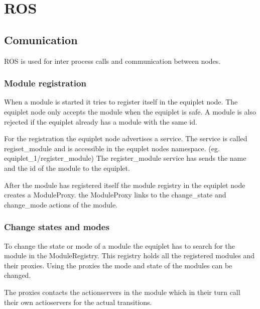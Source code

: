 \section{ROS}
\subsection{Comunication}
ROS is used for inter process calls and communication between nodes.

\subsubsection{Module registration}
When a module is started it tries to register itself in the equiplet node.
The equiplet node only accepts the module when the equiplet is safe.
A module is also rejected if the equiplet already has a module with the same id.

For the registration the equiplet node advertises a service. 
The service is called regiset\_module and is accessible in the equplet nodes namespace. 
(eg. equiplet\_1/register\_module)
The register\_module service has sends the name and the id of the module to the equiplet.

After the module has registered itself the module registry in the equiplet node creates a ModuleProxy. 
the ModuleProxy links to the change\_state and change\_mode actions of the module.

\subsubsection{Change states and modes}
To change the state or mode of a module the equiplet has to search for the module in the ModuleRegistry. 
This registry holds all the registered modules and their proxies. 
Using the proxies the mode and state of the modules can be changed.

The proxies contacts the actionservers in the module which in their turn call their own actioservers for the actual transitions.
